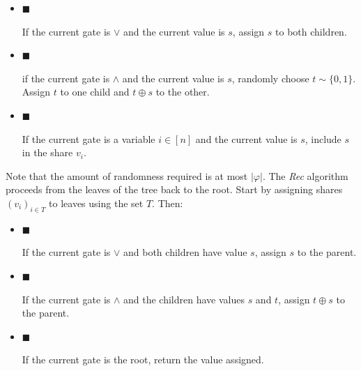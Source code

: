 \documentclass[10pt,a4paper]{article}
\begin{document}
\begin{itemize}


\item[] 
$\blacksquare$ 


If the current gate is $\lor$ and the current value is $s$, assign $s$ to both children.\par





\item[] 
$\blacksquare$ 


if the current gate is $\land$ and the current value is $s$, randomly choose $t\sim\{0,1\}$. Assign $t$ to one child and $t\oplus s$ to the other.\par





\item[] 
$\blacksquare$ 


If the current gate is a variable $i\in[n]$ and the current value is $s$, include $s$ in the share $v_{i}$.\par





\end{itemize}


Note that the amount of randomness required is at most $|\varphi|$. The \emph{Rec} algorithm proceeds from the leaves of the tree back to the root. Start by assigning shares $(v_{i})_{i\in T}$ to leaves using the set $T$. Then:\par


\begin{itemize}


\item[] 
$\blacksquare$ 


If the current gate is $\lor$ and both children have value $s$, assign $s$ to the parent.\par





\item[] 
$\blacksquare$ 


If the current gate is $\land$ and the children have values $s$ and $t$, assign $t\oplus s$ to the parent.\par





\item[] 
$\blacksquare$ 


If the current gate is the root, return the value assigned.\par





\end{itemize}
\end{document}
